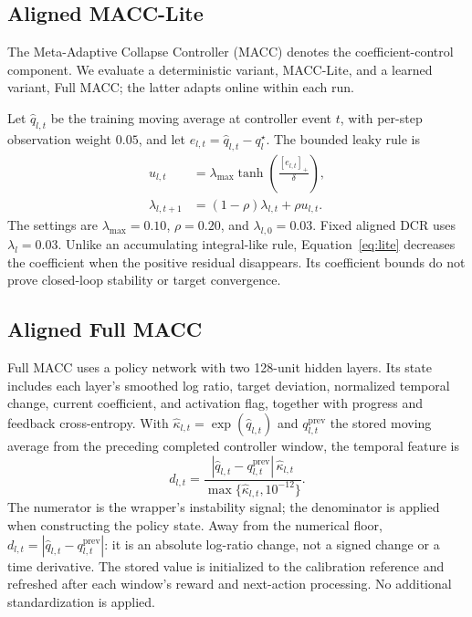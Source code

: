\documentclass[a4paper,fleqn]{cas-dc}
\begin{document}
\subsection{Aligned MACC-Lite}

The Meta-Adaptive Collapse Controller (MACC) denotes the coefficient-control
component. We evaluate a deterministic variant, MACC-Lite, and a learned
variant, Full MACC; the latter adapts online within each run.

Let $\widehat q_{l,t}$ be the training moving average at controller
event $t$, with per-step observation weight $0.05$, and let
$e_{l,t}=\widehat q_{l,t}-q_l^\star$. The bounded leaky rule is
\begin{align}
 u_{l,t}&=
 \lambda_{\max}\tanh\!\left(\frac{[e_{l,t}]_+}{\delta}\right),\\
 \lambda_{l,t+1}&=(1-\rho)\lambda_{l,t}+\rho u_{l,t}.
 \label{eq:lite}
\end{align}
The settings are $\lambda_{\max}=0.10$, $\rho=0.20$, and
$\lambda_{l,0}=0.03$. Fixed aligned DCR uses $\lambda_l=0.03$.
Unlike an accumulating integral-like rule,
Equation~\eqref{eq:lite} decreases the coefficient when the
positive residual disappears. Its coefficient bounds do not prove
closed-loop stability or target convergence.

\subsection{Aligned Full MACC}

Full MACC uses a policy network with two 128-unit hidden layers.
Its state includes each layer's smoothed log ratio, target deviation,
normalized temporal change, current coefficient, and activation flag,
together with progress and feedback cross-entropy.
With $\widehat\kappa_{l,t}=\exp(\widehat q_{l,t})$ and
$q^{\mathrm{prev}}_{l,t}$ the stored moving average from the preceding
completed controller window, the temporal feature is
\begin{equation}
 d_{l,t}=\frac{
 |\widehat q_{l,t}-q^{\mathrm{prev}}_{l,t}|\,\widehat\kappa_{l,t}}
 {\max\{\widehat\kappa_{l,t},10^{-12}\}}.
 \label{eq:full_temporal_state}
\end{equation}
The numerator is the wrapper's instability signal; the denominator is
applied when constructing the policy state. Away from the numerical
floor, $d_{l,t}=|\widehat q_{l,t}-q^{\mathrm{prev}}_{l,t}|$:
it is an absolute log-ratio change, not a signed change or a
time derivative. The stored value is initialized to the calibration
reference and refreshed after each window's reward and next-action
processing. No additional standardization is applied.
\end{document}
